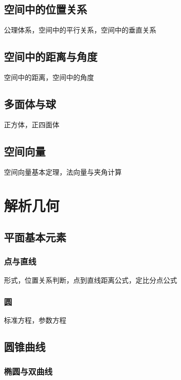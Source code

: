 \documentclass[lang=cn, zihao=4.5]{elegantbook}
\begin{document}
\section{空间中的位置关系}

公理体系，空间中的平行关系，空间中的垂直关系

\section{空间中的距离与角度}

空间中的距离，空间中的角度

\section{多面体与球}

正方体，正四面体

\section{空间向量}

空间向量基本定理，法向量与夹角计算

\chapter{解析几何}

\section{平面基本元素}

\subsection{点与直线}

形式，位置关系判断，点到直线距离公式，定比分点公式

\subsection{圆}

标准方程，参数方程

\section{圆锥曲线}

\subsection{椭圆与双曲线}
\end{document}
